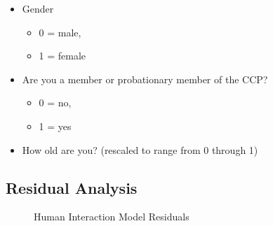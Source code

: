 \documentclass[
  letterpaper,
  DIV=11,
  numbers=noendperiod]{scrartcl}
\begin{document}
\begin{itemize}
\item
  Gender

  \begin{itemize}
  \item
    0 = male,
  \item
    1 = female
  \end{itemize}
\item
  Are you a member or probationary member of the CCP?

  \begin{itemize}
  \item
    0 = no,
  \item
    1 = yes
  \end{itemize}
\item
  How old are you? (rescaled to range from 0 through 1)
\end{itemize}

\newpage{}

\subsection{Residual Analysis}\label{residual-analysis}

\begin{figure}


\caption{\label{fig-resids-human}Human Interaction Model Residuals}

\end{figure}%
\end{document}
